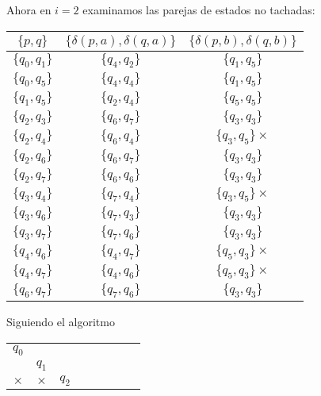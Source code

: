 \begin{itemize}
\begin{center}
\begin{tabular}{cccccccc}
                \end{tabular}
            \end{center}
            Ahora en $i=2$ examinamos las parejas de estados no tachadas:
            \begin{center}
                \begin{tabular}{c||c|c}
                  $\{p,q\}$ & $\{\delta(p,a),\delta(q,a)\}$ & $\{\delta(p,b),\delta(q,b)\}$\\ \hline
                  $\{q_0,q_1\}$ & $\{q_4,q_2\}$ & $\{q_1,q_5\}$ \\ \hline
                  $\{q_0,q_5\}$ & $\{q_4,q_4\}$ & $\{q_1,q_5\}$ \\ \hline
                  $\{q_1,q_5\}$ & $\{q_2,q_4\}$ & $\{q_5,q_5\}$ \\ \hline
                  $\{q_2,q_3\}$ & $\{q_6,q_7\}$ & $\{q_3,q_3\}$ \\ \hline
                  $\{q_2,q_4\}$ & $\{q_6,q_4\}$ & $\{q_3,q_5\}\times$ \\ \hline
                  $\{q_2,q_6\}$ & $\{q_6,q_7\}$ & $\{q_3,q_3\}$ \\ \hline
                  $\{q_2,q_7\}$ & $\{q_6,q_6\}$ & $\{q_3,q_3\}$ \\ \hline
                  $\{q_3,q_4\}$ & $\{q_7,q_4\}$ & $\{q_3,q_5\}\times$ \\ \hline
                  $\{q_3,q_6\}$ & $\{q_7,q_3\}$ & $\{q_3,q_3\}$ \\ \hline
                  $\{q_3,q_7\}$ & $\{q_7,q_6\}$ & $\{q_3,q_3\}$ \\ \hline
                  $\{q_4,q_6\}$ & $\{q_4,q_7\}$ & $\{q_5,q_3\}\times$ \\ \hline
                  $\{q_4,q_7\}$ & $\{q_4,q_6\}$ & $\{q_5,q_3\}\times$ \\ \hline
                  $\{q_6,q_7\}$ & $\{q_7,q_6\}$ & $\{q_3,q_3\}$ \\ \hline
                \end{tabular}
            \end{center}
            Siguiendo el algoritmo
            \begin{center}
                \begin{tabular}{cccccccc}
                   $q_0$ \\ \cline{1-1}
                   \multicolumn{1}{|c|}{} & $q_1$ \\ \cline{1-2}
                   \multicolumn{1}{|c|}{$\times$} & \multicolumn{1}{|c|}{$\times$} & $q_2$ \\ \cline{1-3}

\end{tabular}
\end{center}
\end{itemize}
